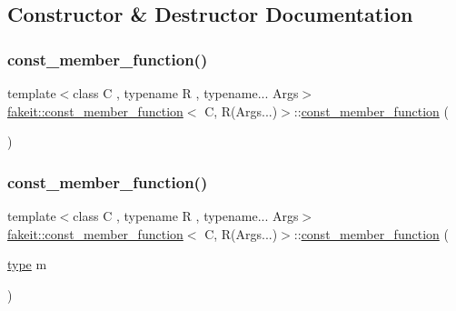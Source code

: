\subsection{Constructor \& Destructor Documentation}
\mbox{\label{classfakeit_1_1const__member__function_3_01C_00_01R_07Args_8_8_8_08_4_abf82401bcb8638fa04ad20507bd74a9a}} 
\subsubsection{\texorpdfstring{const\_member\_function()}{const\_member\_function()}\hspace{0.1cm}{\footnotesize\ttfamily [1/2]}}
{\footnotesize\ttfamily template$<$class C , typename R , typename... Args$>$ \\
\mbox{\hyperlink{classfakeit_1_1const__member__function}{fakeit\+::const\+\_\+member\+\_\+function}}$<$ C, R(Args...)$>$\+::\mbox{\hyperlink{classfakeit_1_1const__member__function}{const\+\_\+member\+\_\+function}} (\begin{DoxyParamCaption}{ }\end{DoxyParamCaption})\hspace{0.3cm}{\ttfamily [inline]}}

\mbox{\label{classfakeit_1_1const__member__function_3_01C_00_01R_07Args_8_8_8_08_4_a965b206414d8432385adcf5bf7690ae3}} 
\subsubsection{\texorpdfstring{const\_member\_function()}{const\_member\_function()}\hspace{0.1cm}{\footnotesize\ttfamily [2/2]}}
{\footnotesize\ttfamily template$<$class C , typename R , typename... Args$>$ \\
\mbox{\hyperlink{classfakeit_1_1const__member__function}{fakeit\+::const\+\_\+member\+\_\+function}}$<$ C, R(Args...)$>$\+::\mbox{\hyperlink{classfakeit_1_1const__member__function}{const\+\_\+member\+\_\+function}} (\begin{DoxyParamCaption}\item[{\mbox{\hyperlink{classfakeit_1_1const__member__function_3_01C_00_01R_07Args_8_8_8_08_4_ab962f803e5a8b5b2078ee8674900288c}{type}}}]{m }\end{DoxyParamCaption})\hspace{0.3cm}{\ttfamily [inline]}}



